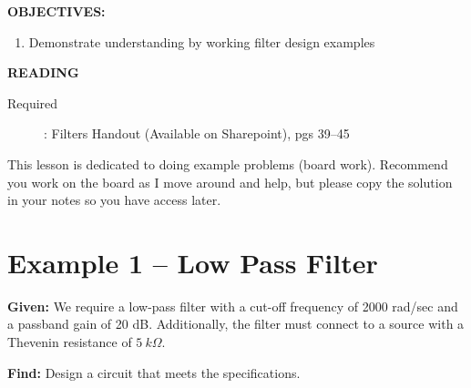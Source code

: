 \documentclass{handout}
\begin{document}
\maketitle

\textbf{OBJECTIVES:}
\begin{enumerate}
\item Demonstrate understanding by working filter design examples
\end{enumerate}

\textbf{READING}
\begin{description}
\item [Required]:
Filters Handout (Available on Sharepoint), pgs 39--45
\end{description}

This lesson is dedicated to doing example problems (board work).  Recommend you work on the board as I move around and help, but please copy the solution in your notes so you have access later.

\section{Example 1 -- Low Pass Filter}
\textbf{Given:}  We require a low-pass filter with a cut-off frequency of 2000 rad/sec and a passband gain of 20 dB.  Additionally, the filter must connect to a source with a Thevenin resistance of $5 \ k\Omega$.

\noindent \textbf{Find:}  Design a circuit that meets the specifications.

\end{document}
